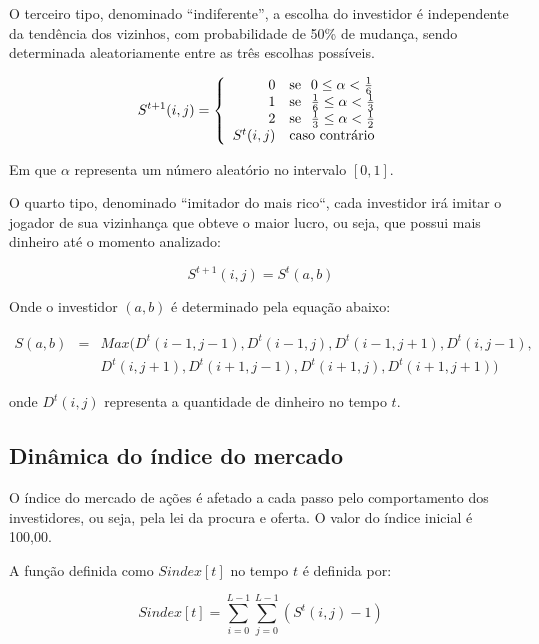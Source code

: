 \documentclass[brazil,ruledheader]{abnt}
\begin{document}
O terceiro tipo, denominado ``indiferente'', a escolha do investidor é
independente da tendência dos vizinhos, com probabilidade de 50\% de
mudança, sendo determinada aleatoriamente entre as três escolhas possíveis.

\begin{equation}
S^{t+1}(i,j)=\left\{ \begin{array}{rl}
0 & \mbox{se\hspace{.7em}} 0 \leq \alpha < \frac{1}{6} \\
1 & \mbox{se\hspace{.7em}} \frac{1}{6} \leq \alpha < \frac{1}{3} \\
2 & \mbox{se\hspace{.7em}} \frac{1}{3} \leq \alpha < \frac{1}{2} \\
S^t(i,j) &  \mbox{caso contrário}
\end{array}\right.
\end{equation}

Em que $\alpha$ representa um número aleatório no intervalo $[0,1]$.

O quarto tipo, denominado ``imitador do mais rico``, cada investidor irá imitar
o jogador de sua vizinhança que obteve o maior lucro, ou seja, que possui mais
dinheiro até o momento analizado: 

\begin{equation}
S^{t+1}(i,j)=S^t(a,b)
\end{equation}

Onde o investidor $(a,b)$ é determinado pela equação abaixo:

\begin{eqnarray}
S(a,b)&=&Max(D^t(i-1,j-1),D^t(i-1,j),D^t(i-1,j+1),D^t(i,j-1),\nonumber \\
&& D^t(i,j+1),D^t(i+1,j-1),D^t(i+1,j),D^t(i+1,j+1))
\end{eqnarray}

onde $D^t(i,j)$ representa a quantidade de dinheiro no tempo $t$. 
\subsection{Dinâmica  do índice do mercado }

O índice do mercado de ações é afetado a cada passo pelo comportamento
dos investidores, ou seja, pela lei da procura e oferta.  O
valor do índice inicial é 100,00.

A função definida como $Sindex[t]$ no tempo $t$ é
definida por:

\begin{equation}
Sindex[t]=\sum_{i=0}^{L-1}\sum_{j=0}^{L-1}(S^t(i,j)-1)
\end{equation}
\end{document}
